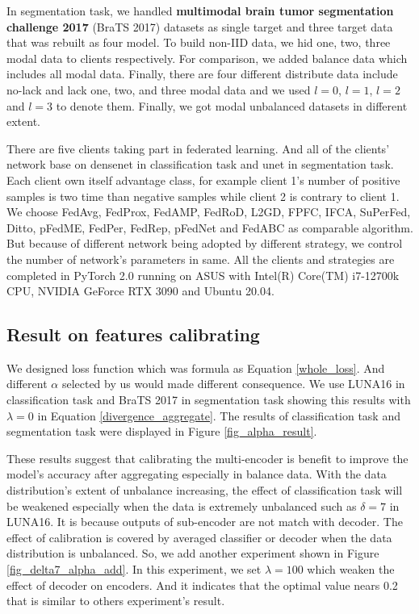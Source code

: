 \documentclass[journal]{IEEEtran}
\begin{document}
In segmentation task, we handled \textbf{multimodal brain tumor segmentation challenge 2017} (BraTS 2017) datasets\cite{6975210} as single target and three target data that was rebuilt as four model. To build non-IID data, we hid one, two, three modal data to clients respectively. For comparison, we added balance data which includes all modal data. Finally, there are four different distribute data include no-lack and lack one, two, and three modal data and we used $l=0$, $l=1$, $l=2$ and $l=3$ to denote them. Finally, we got modal unbalanced datasets in different extent.

There are five clients taking part in federated learning. And all of the clients' network base on densenet in classification task and unet in segmentation task. Each client own itself advantage class, for example client 1's number of positive samples is two time than negative samples while client 2 is contrary to client 1.
We choose FedAvg\cite{McMahan2016CommunicationEfficientLO},  FedProx\cite{Sahu2018FederatedOI}, FedAMP\cite{Huang2020PersonalizedCF}, FedRoD\cite{Chen2022OnBG}, L2GD\cite{Hanzely2020FederatedLO}, FPFC\cite{Yu2022ClusteredFL}, IFCA\cite{Ghosh2020AnEF}, SuPerFed\cite{Bi2019ComparisonOC}, Ditto\cite{Li2020DittoFA}, pFedME\cite{Dinh2020PersonalizedFL}, FedPer\cite{Arivazhagan2019FederatedLW}, FedRep\cite{Collins2021ExploitingSR}, pFedNet\cite{Zhao2023MedicalFM} and FedABC\cite{Wang2023FedABCTF} as comparable algorithm. But because of different network being adopted by different strategy, we control the number of network's parameters in same. All the clients and strategies are completed in PyTorch 2.0 running on ASUS with Intel(R) Core(TM) i7-12700k CPU, NVIDIA GeForce RTX 3090 and Ubuntu 20.04. 

\subsection{Result on features calibrating}
We designed loss function which was formula as Equation \ref{whole_loss}. And different $\alpha$ selected by us would made different consequence. We use LUNA16 in classification task and BraTS 2017 in segmentation task showing this results with $\lambda=0$ in Equation \ref{divergence_aggregate}. The results of classification task and segmentation task were displayed in Figure \ref{fig_alpha_result}.

These results suggest that calibrating the multi-encoder is benefit to improve the model's accuracy after aggregating especially in balance data. With the data distribution's extent of unbalance increasing, the effect of classification task will be weakened especially when the data is extremely unbalanced such as $\delta=7$ in LUNA16. It is because outputs of sub-encoder are not match with decoder. The effect of calibration is covered by averaged classifier or decoder when the data distribution is unbalanced. So, we add another experiment shown in Figure \ref{fig_delta7_alpha_add}. In this experiment, we set $\lambda=100$ which weaken the effect of decoder on encoders. And it indicates that the optimal value nears 0.2 that is similar to others experiment's result.
\end{document}
